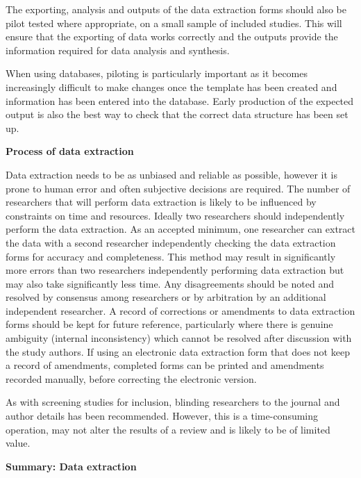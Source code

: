 \documentclass[
  11pt,
  a4paper,
  DIV=11,
  numbers=noendperiod]{scrreprt}
\begin{document}
The exporting, analysis and outputs of the data extraction forms should
also be pilot tested where appropriate, on a small sample of included
studies. This will ensure that the exporting of data works correctly and
the outputs provide the information required for data analysis and
synthesis.

When using databases, piloting is particularly important as it becomes
increasingly difficult to make changes once the template has been
created and information has been entered into the database. Early
production of the expected output is also the best way to check that the
correct data structure has been set up.

\textbf{Process of data extraction}

Data extraction needs to be as unbiased and reliable as possible,
however it is prone to human error and often subjective decisions are
required. The number of researchers that will perform data extraction is
likely to be influenced by constraints on time and resources. Ideally
two researchers should independently perform the data extraction. As an
accepted minimum, one researcher can extract the data with a second
researcher independently checking the data extraction forms for accuracy
and completeness. This method may result in significantly more errors
than two researchers independently performing data extraction but may
also take significantly less time. Any disagreements should be noted and
resolved by consensus among researchers or by arbitration by an
additional independent researcher. A record of corrections or amendments
to data extraction forms should be kept for future reference,
particularly where there is genuine ambiguity (internal inconsistency)
which cannot be resolved after discussion with the study authors. If
using an electronic data extraction form that does not keep a record of
amendments, completed forms can be printed and amendments recorded
manually, before correcting the electronic version.

As with screening studies for inclusion, blinding researchers to the
journal and author details has been recommended. However, this is a
time-consuming operation, may not alter the results of a review and is
likely to be of limited value.

\textbf{Summary: Data extraction}
\end{document}
